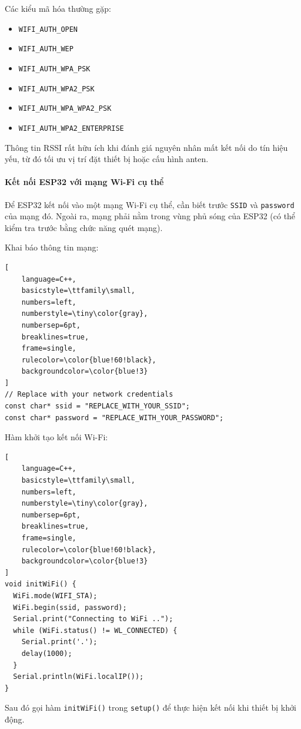 Các kiểu mã hóa thường gặp:
\begin{itemize}
	\item \texttt{WIFI\_AUTH\_OPEN}
	\item \texttt{WIFI\_AUTH\_WEP}
	\item \texttt{WIFI\_AUTH\_WPA\_PSK}
	\item \texttt{WIFI\_AUTH\_WPA2\_PSK}
	\item \texttt{WIFI\_AUTH\_WPA\_WPA2\_PSK}
	\item \texttt{WIFI\_AUTH\_WPA2\_ENTERPRISE}
\end{itemize}

Thông tin RSSI rất hữu ích khi đánh giá nguyên nhân mất kết nối do tín hiệu yếu, từ đó tối ưu vị trí đặt thiết bị hoặc cấu hình anten.

\paragraph{Kết nối ESP32 với mạng Wi-Fi cụ thể}
Để ESP32 kết nối vào một mạng Wi-Fi cụ thể, cần biết trước \texttt{SSID} và \texttt{password} của mạng đó. Ngoài ra, mạng phải nằm trong vùng phủ sóng của ESP32 (có thể kiểm tra trước bằng chức năng quét mạng).

Khai báo thông tin mạng:
\begin{lstlisting}[
	language=C++,
	basicstyle=\ttfamily\small,
	numbers=left,
	numberstyle=\tiny\color{gray},
	numbersep=6pt,
	breaklines=true,
	frame=single,
	rulecolor=\color{blue!60!black},
	backgroundcolor=\color{blue!3}
]
// Replace with your network credentials
const char* ssid = "REPLACE_WITH_YOUR_SSID";
const char* password = "REPLACE_WITH_YOUR_PASSWORD";
\end{lstlisting}

Hàm khởi tạo kết nối Wi-Fi:
\begin{lstlisting}[
	language=C++,
	basicstyle=\ttfamily\small,
	numbers=left,
	numberstyle=\tiny\color{gray},
	numbersep=6pt,
	breaklines=true,
	frame=single,
	rulecolor=\color{blue!60!black},
	backgroundcolor=\color{blue!3}
]
void initWiFi() {
  WiFi.mode(WIFI_STA);
  WiFi.begin(ssid, password);
  Serial.print("Connecting to WiFi ..");
  while (WiFi.status() != WL_CONNECTED) {
    Serial.print('.');
    delay(1000);
  }
  Serial.println(WiFi.localIP());
}
\end{lstlisting}

Sau đó gọi hàm \texttt{initWiFi()} trong \texttt{setup()} để thực hiện kết nối khi thiết bị khởi động.

